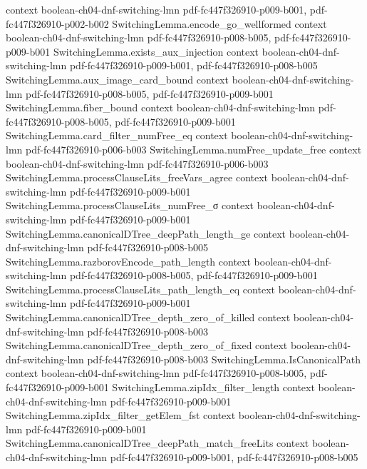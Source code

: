 \begin{lemma}
  {context}
  {boolean-ch04-dnf-switching-lmn}
  {pdf-fc447f326910-p009-b001,
    pdf-fc447f326910-p002-b002}
\proofstep
  {SwitchingLemma.encode_go_wellformed}
  {context}
  {boolean-ch04-dnf-switching-lmn}
  {pdf-fc447f326910-p008-b005,
    pdf-fc447f326910-p009-b001}
\proofstep
  {SwitchingLemma.exists_aux_injection}
  {context}
  {boolean-ch04-dnf-switching-lmn}
  {pdf-fc447f326910-p009-b001,
    pdf-fc447f326910-p008-b005}
\proofstep
  {SwitchingLemma.aux_image_card_bound}
  {context}
  {boolean-ch04-dnf-switching-lmn}
  {pdf-fc447f326910-p008-b005,
    pdf-fc447f326910-p009-b001}
\proofstep
  {SwitchingLemma.fiber_bound}
  {context}
  {boolean-ch04-dnf-switching-lmn}
  {pdf-fc447f326910-p008-b005,
    pdf-fc447f326910-p009-b001}
\proofstep
  {SwitchingLemma.card_filter_numFree_eq}
  {context}
  {boolean-ch04-dnf-switching-lmn}
  {pdf-fc447f326910-p006-b003}
\proofstep
  {SwitchingLemma.numFree_update_free}
  {context}
  {boolean-ch04-dnf-switching-lmn}
  {pdf-fc447f326910-p006-b003}
\proofstep
  {SwitchingLemma.processClauseLits_freeVars_agree}
  {context}
  {boolean-ch04-dnf-switching-lmn}
  {pdf-fc447f326910-p009-b001}
\proofstep
  {SwitchingLemma.processClauseLits_numFree_σ}
  {context}
  {boolean-ch04-dnf-switching-lmn}
  {pdf-fc447f326910-p009-b001}
\proofstep
  {SwitchingLemma.canonicalDTree_deepPath_length_ge}
  {context}
  {boolean-ch04-dnf-switching-lmn}
  {pdf-fc447f326910-p008-b005}
\proofstep
  {SwitchingLemma.razborovEncode_path_length}
  {context}
  {boolean-ch04-dnf-switching-lmn}
  {pdf-fc447f326910-p008-b005,
    pdf-fc447f326910-p009-b001}
\proofstep
  {SwitchingLemma.processClauseLits_path_length_eq}
  {context}
  {boolean-ch04-dnf-switching-lmn}
  {pdf-fc447f326910-p009-b001}
\proofstep
  {SwitchingLemma.canonicalDTree_depth_zero_of_killed}
  {context}
  {boolean-ch04-dnf-switching-lmn}
  {pdf-fc447f326910-p008-b003}
\proofstep
  {SwitchingLemma.canonicalDTree_depth_zero_of_fixed}
  {context}
  {boolean-ch04-dnf-switching-lmn}
  {pdf-fc447f326910-p008-b003}
\proofstep
  {SwitchingLemma.IsCanonicalPath}
  {context}
  {boolean-ch04-dnf-switching-lmn}
  {pdf-fc447f326910-p008-b005,
    pdf-fc447f326910-p009-b001}
\proofstep
  {SwitchingLemma.zipIdx_filter_length}
  {context}
  {boolean-ch04-dnf-switching-lmn}
  {pdf-fc447f326910-p009-b001}
\proofstep
  {SwitchingLemma.zipIdx_filter_getElem_fst}
  {context}
  {boolean-ch04-dnf-switching-lmn}
  {pdf-fc447f326910-p009-b001}
\proofstep
  {SwitchingLemma.canonicalDTree_deepPath_match_freeLits}
  {context}
  {boolean-ch04-dnf-switching-lmn}
  {pdf-fc447f326910-p009-b001,
    pdf-fc447f326910-p008-b005}

\end{lemma}
